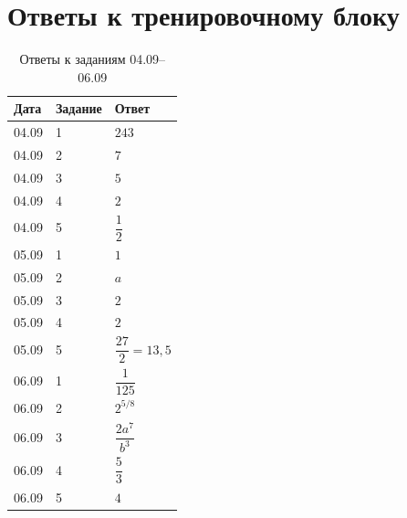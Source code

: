 \documentclass[a4paper,12pt]{article}
\begin{document}
\section*{Ответы к тренировочному блоку}
\renewcommand{\arraystretch}{1.35}
\begin{table}[htbp]
\centering
\caption{Ответы к заданиям 04.09--06.09}
\begin{tabularx}{\linewidth}{@{}p{0.19\linewidth}p{0.18\linewidth}X@{}}
\toprule
\textbf{Дата} & \textbf{Задание} & \textbf{Ответ}\\
\midrule
04.09 & 1 & \(243\)\\
04.09 & 2 & \(7\)\\
04.09 & 3 & \(5\)\\
04.09 & 4 & \(2\)\\
04.09 & 5 & \(\dfrac12\)\\
\midrule
05.09 & 1 & \(1\)\\
05.09 & 2 & \(a\)\\
05.09 & 3 & \(2\)\\
05.09 & 4 & \(2\)\\
05.09 & 5 & \(\dfrac{27}{2}=13{,}5\)\\
\midrule
06.09 & 1 & \(\dfrac1{125}\)\\
06.09 & 2 & \(2^{5/8}\)\\
06.09 & 3 & \(\dfrac{2a^7}{b^3}\)\\
06.09 & 4 & \(\dfrac53\)\\
06.09 & 5 & \(4\)\\
\bottomrule
\end{tabularx}
\end{table}
\end{document}
